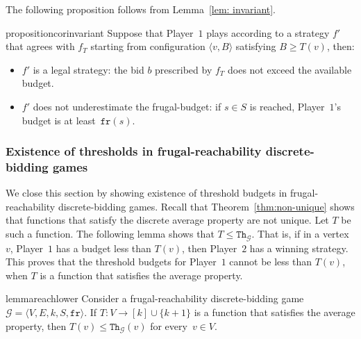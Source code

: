 \documentclass{article}\providecommand{\nequiv}{\not\equiv}\usepackage[a4paper,margin=20mm]{geometry}
\newcommand{\PO}{Player~$1$\xspace}
\newcommand{\PT}{Player~$2$\xspace}
\newcommand{\G}{{\mathcal G}}
\newcommand{\fr}{\texttt{fr}}
\newcommand{\thresh}{\texttt{Th}\xspace}
\newcommand{\zug}[1]{\langle #1  \rangle}
\begin{document}
The following proposition follows from Lemma~\ref{lem: invariant}.








\begin{restatable}{proposition}{corinvariant}
	\label{prop: corinvariant}
	Suppose that \PO plays according to a strategy $f'$ that agrees with \(f_T\) starting from configuration \(\zug{v, B}\) satisfying \(B \geq T(v)\), then:  	
	\begin{itemize}
	\item $f'$ is a legal strategy: the bid $b$ prescribed by $f_T$ does not exceed the available budget.
	\item $f'$ does not underestimate the frugal-budget: if \(s \in S\) is reached, \PO's budget is at least~\(\fr(s)\). 
	\end{itemize}
\end{restatable}






\subsubsection{Existence of thresholds in frugal-reachability discrete-bidding games}
We close this section by showing existence of threshold budgets in frugal-reachability discrete-bidding games. 
Recall that Theorem~\ref{thm:non-unique} shows that functions that satisfy the discrete average property are not unique. 
Let \(T\) be such a function.
The following lemma shows that \(T \leq \thresh_{\G}\). 
That is, if in a vertex \(v\), \PO has a budget less than \(T(v)\), then \PT has a winning strategy.
This proves that the threshold budgets for \PO cannot be less than \(T(v)\), when \(T\) is a function that satisfies the average property.




\begin{restatable}{lemma}{reachlower}
	\label{lem:reach-lower}
	Consider a frugal-reachability discrete-bidding game \(\G = \zug{V, E, k, S, \fr}\). If \(T: V \rightarrow [k] \cup \{k+1\}\) is a function that satisfies the average property, then \(T(v) \leq \thresh_{\G}(v)\) for every~\(v \in V\). 
\end{restatable}
\end{document}
